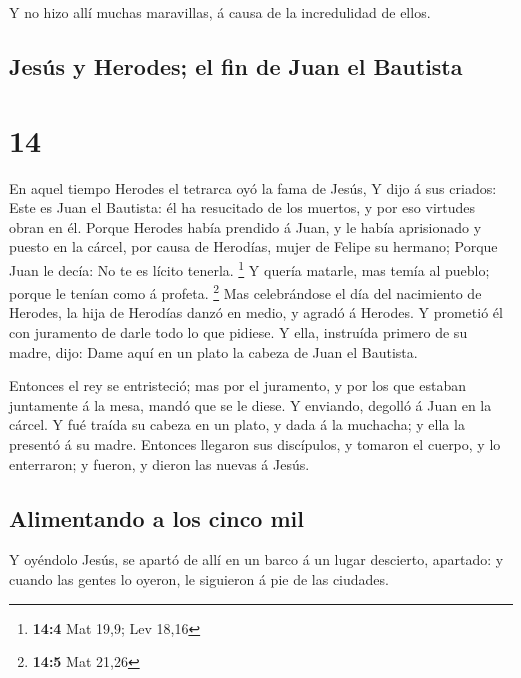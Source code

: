  Y no hizo allí muchas maravillas, á causa de la
incredulidad de ellos.

\hypertarget{jesuxfas-y-herodes-el-fin-de-juan-el-bautista}{%
\subsection{Jesús y Herodes; el fin de Juan el
Bautista}\label{jesuxfas-y-herodes-el-fin-de-juan-el-bautista}}

\hypertarget{section-13}{%
\section{14}\label{section-13}}

 En aquel tiempo Herodes el tetrarca oyó la fama de Jesús,
 Y dijo á sus criados: Este es Juan el Bautista: él ha
resucitado de los muertos, y por eso virtudes obran en él. 
Porque Herodes había prendido á Juan, y le había aprisionado y puesto en
la cárcel, por causa de Herodías, mujer de Felipe su hermano;
 Porque Juan le decía: No te es lícito tenerla. \footnote{\textbf{14:4}
  Mat 19,9; Lev 18,16}  Y quería matarle, mas temía al
pueblo; porque le tenían como á profeta. \footnote{\textbf{14:5} Mat
  21,26}  Mas celebrándose el día del nacimiento de Herodes,
la hija de Herodías danzó en medio, y agradó á Herodes.  Y
prometió él con juramento de darle todo lo que pidiese.  Y
ella, instruída primero de su madre, dijo: Dame aquí en un plato la
cabeza de Juan el Bautista.

 Entonces el rey se entristeció; mas por el juramento, y por
los que estaban juntamente á la mesa, mandó que se le diese.
 Y enviando, degolló á Juan en la cárcel.  Y
fué traída su cabeza en un plato, y dada á la muchacha; y ella la
presentó á su madre.  Entonces llegaron sus discípulos, y
tomaron el cuerpo, y lo enterraron; y fueron, y dieron las nuevas á
Jesús.

\hypertarget{alimentando-a-los-cinco-mil}{%
\subsection{Alimentando a los cinco
mil}\label{alimentando-a-los-cinco-mil}}

 Y oyéndolo Jesús, se apartó de allí en un barco á un lugar
descierto, apartado: y cuando las gentes lo oyeron, le siguieron á pie
de las ciudades.

